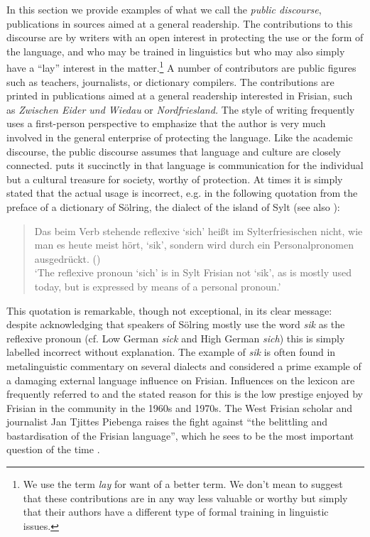 \documentclass[output=paper]{langsci/langscibook}
\begin{document}
In this section we provide examples of what we call the \textit{public discourse}, publications in sources aimed at a general readership. The contributions to this discourse are by writers with an open interest in protecting the use or the form of the language, and who may be trained in linguistics but who may also simply have a “lay” interest in the matter.\footnote{We use the term \textit{lay} for want of a better term. We don’t mean to suggest that these contributions are in any way less valuable or worthy but simply that their authors have a different type of formal training in linguistic issues.} A number of contributors are public figures such as teachers, journalists, or dictionary compilers. The contributions are printed in publications aimed at a general readership interested in Frisian, such as \textit{Zwischen Eider und Wiedau} or \textit{Nordfriesland.} The style of writing frequently uses a first-person perspective to emphasize that the author is very much involved in the general enterprise of protecting the language. Like the academic discourse, the public discourse assumes that language and culture are closely connected. \citet{Holander1969} puts it succinctly in that language is communication for the individual but a cultural treasure for society, worthy of protection. At times it is simply stated that the actual usage is incorrect, e.g. in the following quotation from the preface of a dictionary of Sölring, the dialect of the island of Sylt (see also \citealt{BosseLanger2021}): 

\begin{quote}
Das beim Verb stehende reflexive ‘sich’ heißt im Sylterfriesischen nicht, wie man es heute meist hört, ‘sik’, sondern wird durch ein Personalpronomen ausgedrückt. (\citealt{Schmidt1972})\smallskip\\\relax
‘The reflexive pronoun ‘sich’ is in Sylt Frisian not ‘sik’, as is mostly used today, but is expressed by means of a personal pronoun.’
\end{quote}

This quotation is remarkable, though not exceptional, in its clear message: despite acknowledging that speakers of Sölring mostly use the word \textit{sik} as the reflexive pronoun (cf. Low German \textit{sick} and High German \textit{sich}) this is simply labelled incorrect without explanation. The example of \textit{sik} is often found in metalinguistic commentary on several dialects and considered a prime example of a damaging external language influence on Frisian. Influences on the lexicon are frequently referred to and the stated reason for this is the low prestige enjoyed by Frisian in the community in the 1960s and 1970s. The West Frisian scholar and journalist Jan Tjittes Piebenga raises the fight against “the belittling and bastardisation of the Frisian language”, which he sees to be the most important question of the time \citep[11]{Piebenga1966}. 
\end{document}
